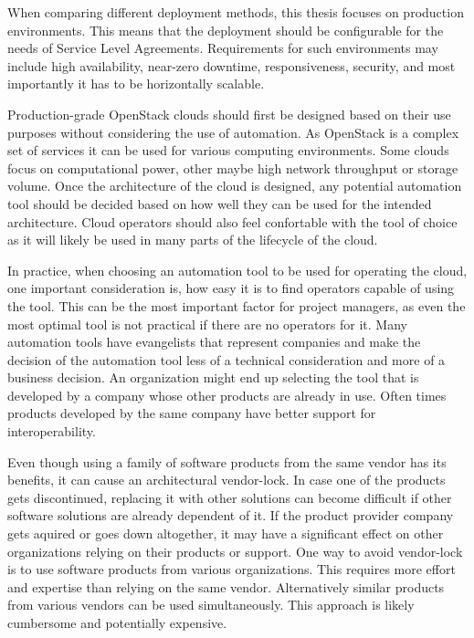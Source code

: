 When comparing different deployment methods, this thesis focuses on production
environments. This means that the deployment should be configurable for the
needs of Service Level Agreements. Requirements for such environments may
include high availability, near-zero downtime, responsiveness, security, and
most importantly it has to be horizontally scalable.

Production-grade OpenStack clouds should first be designed based on their use
purposes without considering the use of automation. As OpenStack is a complex
set of services it can be used for various computing environments. Some clouds
focus on computational power, other maybe high network throughput or storage
volume. Once the architecture of the cloud is designed, any potential
automation tool should be decided based on how well they can be used for the
intended architecture. Cloud operators should also feel confortable with the
tool of choice as it will likely be used in many parts of the lifecycle of the
cloud.

In practice, when choosing an automation tool to be used for operating the
cloud, one important consideration is, how easy it is to find operators capable
of using the tool. This can be the most important factor for project managers,
as even the most optimal tool is not practical if there are no operators for
it. Many automation tools have evangelists that represent companies and make
the decision of the automation tool less of a technical consideration and more
of a business decision. An organization might end up selecting the tool that is
developed by a company whose other products are already in use. Often times
products developed by the same company have better support for
interoperability.

Even though using a family of software products from the same vendor has its
benefits, it can cause an architectural vendor-lock. In case one of the
products gets discontinued, replacing it with other solutions can become
difficult if other software solutions are already dependent of it. If the
product provider company gets aquired or goes down altogether, it may have a
significant effect on other organizations relying on their products or support.
One way to avoid vendor-lock is to use software products from various
organizations. This requires more effort and expertise than relying on the same
vendor. Alternatively similar products from various vendors can be used
simultaneously. This approach is likely cumbersome and potentially expensive.


